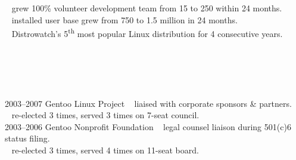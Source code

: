 \documentclass[]{friggeri-cv} %
\begin{document}
\begin{entrylist}
{{\tiny {}} ~ grew 100\% volunteer development team from 15 to 250 within 24 months.\\
{\tiny {}} ~ installed user base grew from 750 to 1.5 million in 24 months.\\
{\tiny {}} ~ Distrowatch's 5\textsuperscript{th} most popular Linux distribution for 4 consecutive years.}
\end{entrylist}
\section{{} {} {\normalsize {}~~}}
\begin{entrylist}
\entry
{2003--2007}
{Gentoo Linux Project}
{}
{{\tiny {}} ~ liaised with corporate sponsors \& partners.\\
{\tiny {}} ~ re-elected 3 times, served 3 times on 7-seat council.\\}
\entry
{2003--2006}
{Gentoo Nonprofit Foundation}
{}
{{\tiny {}} ~ legal counsel liaison during 501(c)6 status filing.\\
{\tiny {}} ~ re-elected 3 times, served 4 times on 11-seat board.}
\end{entrylist}
\section{{} {} {\normalsize {}~~}}
\end{document}
